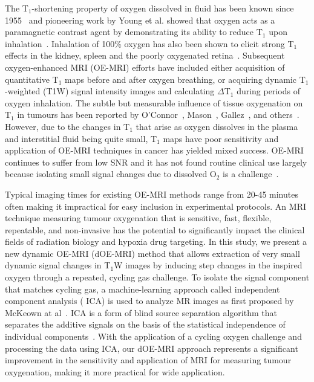 The T$_1$-shortening property of oxygen dissolved in fluid has been known since 1955~\cite{Chiarotti:1955kf} and pioneering work by Young et al. showed that oxygen acts as a paramagnetic contrast agent by demonstrating its ability to reduce T$_1$ upon inhalation~\cite{Young:1981vf}. 
Inhalation of 100\% oxygen has also been shown to elicit strong T$_1$ effects in the kidney\cite{Jones:2002dh}, spleen\cite{Tadamura:1997vc} and the poorly oxygenated retina~\cite{Berkowitz:2001uz}. 
Subsequent oxygen-enhanced MRI (OE-MRI) efforts have included either acquisition of quantitative T$_1$ maps before and after oxygen breathing, or acquiring dynamic T$_1$-weighted (T1W) signal intensity images and calculating $\Delta$T$_1$ during periods of oxygen inhalation.
The subtle but measurable influence of tissue oxygenation on T$_1$ in tumours has been reported by O'Connor~\cite{OConnor:2016ee,OConnor:2009ku,OConnor:2009bp,Little:2018iu}, Mason~\cite{Zhao:2015ez,White:2016fz,Hallac:2014cb}, Gallez~\cite{Jordan:2012do}, and others~\cite{Tadamura:1997vc,McGrath:2008kx,Kershaw:2010ha,Linnik:2013hf}. 
However, due to the changes in T$_1$ that arise as oxygen dissolves in the plasma and interstitial fluid being quite small, T$_1$ maps have poor sensitivity and application of OE-MRI techniques in cancer has yielded mixed success.
OE-MRI continues to suffer from low \ac{SNR} and it has not found routine clinical use largely because isolating small signal changes due to dissolved O$_2$ is a challenge~\cite{OConnor:2016ee, Zhao:2015ez}.

Typical imaging times for existing OE-MRI methods range from 20-45 minutes often making it impractical for easy inclusion in experimental protocols. 
An MRI technique measuring tumour oxygenation that is sensitive, fast, flexible, repeatable, and non-invasive has the potential to significantly impact the clinical fields of radiation biology and hypoxia drug targeting.
In this study, we present a new dynamic OE-MRI (dOE-MRI) method that allows extraction of very small dynamic signal changes in T$_1$W images by inducing step changes in the inspired oxygen through a repeated, cycling gas challenge.
To isolate the signal component that matches cycling gas, a machine-learning approach called independent component analysis ( \ac{ICA}) is used to analyze MR images as first proposed by McKeown at al~\cite{McKeown:1998wo}.
 \ac{ICA} is a form of blind source separation algorithm that separates the additive signals on the basis of the statistical independence of individual components~\cite{Hyvarinen:2000vk}.
With the application of a cycling oxygen challenge and processing the data using \ac{ICA}, our \ac{dOE-MRI} approach represents a significant improvement in the sensitivity and application of MRI for measuring tumour oxygenation, making it more practical for wide application.
